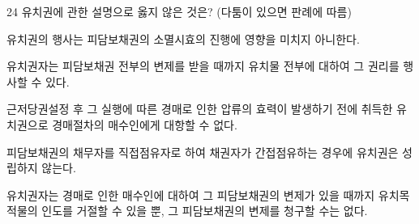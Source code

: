 \begin{question}{24}
유치권에 관한 설명으로 옳지 않은 것은? (다툼이 있으면 판례에 따름)
\begin{choices}
  \item 유치권의 행사는 피담보채권의 소멸시효의 진행에 영향을 미치지 아니한다.
  \item 유치권자는 피담보채권 전부의 변제를 받을 때까지 유치물 전부에 대하여 그 권리를 행사할 수 있다.
  \item 근저당권설정 후 그 실행에 따른 경매로 인한 압류의 효력이 발생하기 전에 취득한 유치권으로 경매절차의 매수인에게 대항할 수 없다.
  \item 피담보채권의 채무자를 직접점유자로 하여 채권자가 간접점유하는 경우에 유치권은 성립하지 않는다.
  \item 유치권자는 경매로 인한 매수인에 대하여 그 피담보채권의 변제가 있을 때까지 유치목적물의 인도를 거절할 수 있을 뿐, 그 피담보채권의 변제를 청구할 수는 없다.
\end{choices}
\end{question}
